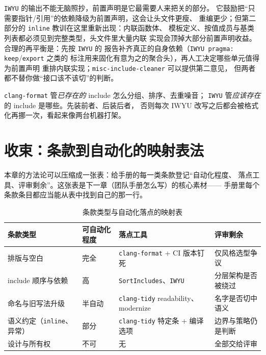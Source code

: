 \documentclass[12pt,a4paper,fontset=fandol]{ctexbook}
\newcommand{\Tp}[1]{\texttt{#1}}
\newcommand{\Bk}{\discretionary{}{}{}}
\begin{document}
\Tp{IWYU} 的输出不能无脑照抄，前置声明是它最需要人来把关的部分。
它鼓励把``只需要指针/引用''的依赖降级为前置声明，这会让头文件更瘦、
重编更少；但第二部分的 \Tp{inline} 教训在这里重新出现：内联函数体、
模板定义、按值成员与基类列表都必须见到完整类型，头文件里大量内联
实现会顶掉大部分前置声明收益。合理的再平衡是：先按 \Tp{IWYU} 的
报告补齐真正的自身依赖（\Tp{IWYU pragma: keep}/{\Bk}\Tp{export} 之类的
标注用来固化有意为之的聚合头），再人工决定哪些单元值得为前置声明
重排内联实现；\Tp{misc-include-cleaner} 可以提供第二意见，
但两者都不替你做``接口该不该切''的判断。

\begin{note}[title={include 秩序的两件工具如何分工}]
\Tp{clang-format} 管\emph{已存在的} include 怎么分组、排序、去重噪音；
\Tp{IWYU} 管\emph{应该存在}的 include 是哪些。先装前者、后装后者，
否则每次 IWYU 改写之后都会被格式化再挪一次，看起来像两台机器打架。
\end{note}

\section{收束：条款到自动化的映射表法}
\label{sec:ch13-mapping}

本章的方法论可以压缩成一张表：给手册的每一类条款登记``自动化程度、
落点工具、评审剩余''。这张表是下一章（团队手册怎么写）的核心素材——
手册里每个条款条目都应当能从表中找到自己的那一行。

\begin{table}[htbp]
\centering
\caption{条款类型与自动化落点的映射表}\label{tab:ch13-map}
\begin{tabularx}{\textwidth}{@{}
  >{\raggedright\arraybackslash}p{}
  >{\raggedright\arraybackslash}p{}
  >{\raggedright\arraybackslash}p{}
  >{\raggedright\arraybackslash}X@{}}
\toprule
条款类型 & 可自动化程度 & 落点工具 & 评审剩余 \\
\midrule
排版与空白 & 完全 & \Tp{clang-format} + CI 版本钉死 & 仅风格选型争议 \\
\addlinespace
include 顺序与依赖 & 高 & \Tp{SortIncludes}、\Tp{IWYU} & 分层架构是否被绕过 \\
\addlinespace
命名与旧写法升级 & 半自动 & \Tp{clang-tidy} readability、modernize & 名字是否切中语义 \\
\addlinespace
语义约定（\Tp{inline}、异常） & 部分 & \Tp{clang-tidy} 特定条 + 编译选项 & 边界与策略仍是判断 \\
\addlinespace
设计与所有权 & 不可 & 无 & 全部交给评审 \\
\bottomrule
\end{tabularx}
\end{table}
\end{document}
